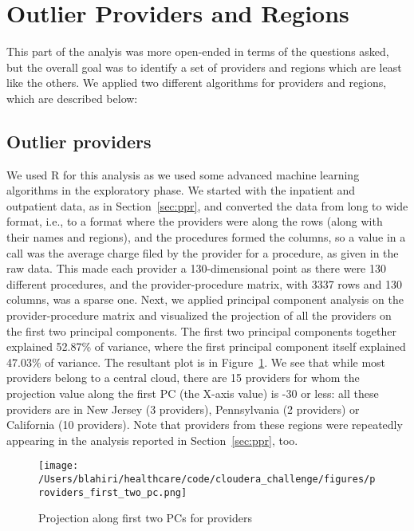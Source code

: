 \section{Outlier Providers and Regions}
\label{sec:least_likely}
This part of the analyis was more open-ended in terms of the questions asked, but the overall goal was to identify a set of providers and regions which are least like the others. We applied two different algorithms for providers and regions, which are described below:

\subsection{Outlier providers}
\label{subsec:outlier_providers}
We used R for this analysis as we used some advanced machine learning algorithms in the exploratory phase. We started with the inpatient and outpatient data, as in Section~\ref{sec:ppr}, and converted the data from long to wide format, i.e., to a format where the providers were along the rows (along with their names and regions), and the procedures formed the columns, so a value in a call was the average charge filed by the provider for a procedure, as given in the raw data. This made each provider a 130-dimensional point as there were 130 different procedures, and the provider-procedure matrix, with 3337 rows and 130 columns, was a sparse one. Next, we applied principal component analysis on the provider-procedure matrix and visualized the projection of all the providers on the first two principal components. The first two principal components together explained 52.87\% of variance, where the first principal component itself explained 47.03\% of variance. The resultant plot is in Figure~\ref{fig:providers_first_two_pc}. We see that while most providers belong to a central cloud, there are 15 providers for whom the projection value along the first PC (the X-axis value) is -30 or less: all these providers are in New Jersey (3 providers), Pennsylvania (2 providers) or California (10 providers). Note that providers from these regions were repeatedly appearing in the analysis reported in Section~\ref{sec:ppr}, too.\\ 

\begin{figure}[!h]
    \centering
    \texttt{[image: /Users/blahiri/healthcare/code/cloudera\_challenge/figures/providers\_first\_two\_pc.png]}
    \caption{\small Projection along first two PCs for providers}
    \label{fig:providers_first_two_pc}
\end{figure}  

